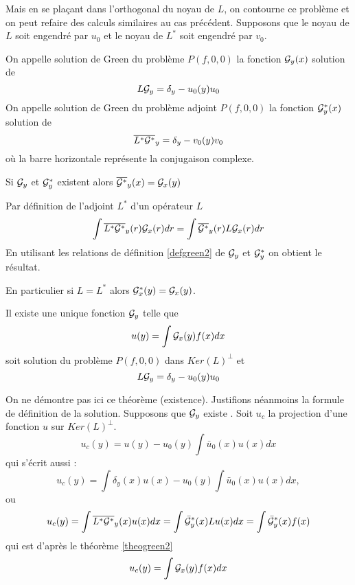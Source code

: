 \documentclass[12pt]{book}
\begin{document}
Mais 
en se pla\c cant dans l'orthogonal du noyau de $L$, on contourne ce probl\`eme
et on peut refaire des calculs similaires au cas pr\'ec\'edent.
Supposons que le noyau de $L$ soit engendr\'e par $u_0$ et le noyau de
$L^*$ soit engendr\'e par $v_0$.
\begin{defn}\label{defgreen2}
On appelle solution de Green du probl\`eme $P(f,0,0)$ la fonction
${\cal G}_y(x)$ solution de 
\begin{equation}
L{\cal G}_y=\delta_y-u_0(y)u_0
\end{equation}
On appelle solution de Green du probl\`eme adjoint $P(f,0,0)$ la fonction
${\cal G}^*_y(x)$ solution de 
\begin{equation}
\overline{L^*{\cal G}^*}_y=\delta_y-v_0(y)v_0
\end{equation}
 o\`u la barre horizontale repr\'esente la conjugaison complexe.
\end{defn}
\begin{thm}\label{theogreen2}
Si ${\cal G}_y$ et ${\cal G}^*_y$ existent alors 
$\overline{{\cal G}^*}_y(x)= {\cal G}_x(y)$
\end{thm}
\begin{pf}
Par d\'efinition de l'adjoint $L^*$ d'un op\'erateur $L$
\begin{equation}
\int \overline{L^*{\cal G^*}}_y(r){\cal G}_x(r)dr=\int \overline{{\cal G^*}}_{y}(r)L{\cal G}_x(r)dr
\end{equation}
En utilisant les relations de d\'efinition \ref{defgreen2}
 de ${\cal G}_y$ et ${\cal G}^*_y$
on obtient le r\'esultat.
\end{pf}
En particulier si $L=L^*$ alors ${\cal G}^*_x(y)= {\cal G}_x(y)$.
\begin{thm}
Il existe une unique fonction ${\cal G}_y$ telle que
\begin{equation}
u(y)=\int {\cal G}_x(y) f(x)dx
\end{equation}
soit solution du probl\`eme $P(f,0,0)$ dans $Ker(L)^\perp$ 
et
\begin{equation}
L{\cal G}_y=\delta_y-u_0(y)u_0
\end{equation}
\end{thm}
On ne d\'emontre pas ici ce th\'eor\`eme (existence). Justifions
n\'eanmoins la formule de d\'efinition de la solution.
Supposons que ${\cal G}_y$ existe .
Soit $u_c$ la projection d'une fonction $u$ sur  $Ker(L)^\perp$.
\begin{equation}
u_c(y)=u(y)-u_0(y)\int \bar{u}_0(x)u(x) dx
\end{equation}
qui s'\'ecrit aussi :
\begin{equation}
u_c(y)=\int \delta_y(x)u(x)-u_0(y)\int \bar{u}_0(x)u(x) dx,
\end{equation}
ou
\begin{equation}
u_c(y)=\int \overline{L^*{\cal G}^*}_y(x) u(x)dx=\int \bar{\cal G}^*_y(x) Lu(x)dx=\int \bar{\cal G}^*_y(x) f(x)
\end{equation}
qui est d'apr\`es le th\'eor\`eme \ref{theogreen2}
\begin{equation}
u_c(y)=\int {\cal G}_x(y) f(x)dx
\end{equation}
\end{document}
